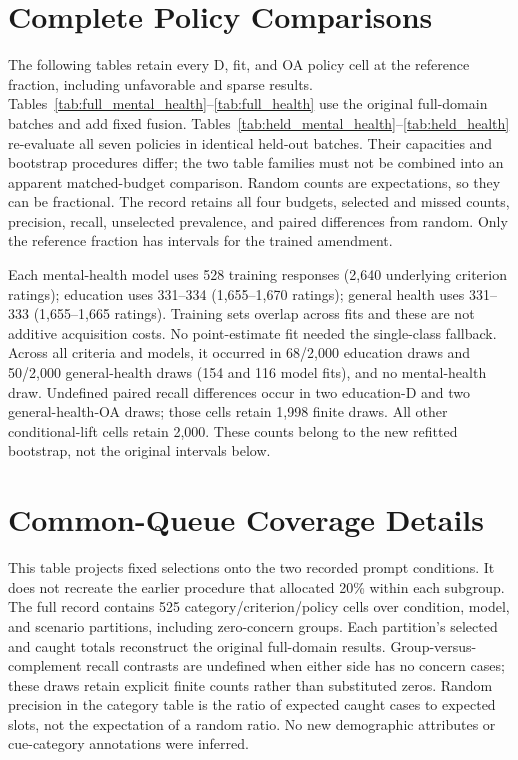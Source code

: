 \documentclass[manuscript,screen,review,anonymous]{acmart}
\begin{document}
\section{Complete Policy Comparisons}\label{app:complete}
The following tables retain every D, fit, and OA policy cell at the reference fraction, including unfavorable and sparse results. Tables~\ref{tab:full_mental_health}--\ref{tab:full_health} use the original full-domain batches and add fixed fusion. Tables~\ref{tab:held_mental_health}--\ref{tab:held_health} re-evaluate all seven policies in identical held-out batches. Their capacities and bootstrap procedures differ; the two table families must not be combined into an apparent matched-budget comparison. Random counts are expectations, so they can be fractional. The record retains all four budgets, selected and missed counts, precision, recall, unselected prevalence, and paired differences from random. Only the reference fraction has intervals for the trained amendment.








Each mental-health model uses 528 training responses (2,640 underlying criterion ratings); education uses 331--334 (1,655--1,670 ratings); general health uses 331--333 (1,655--1,665 ratings). Training sets overlap across fits and these are not additive acquisition costs. No point-estimate fit needed the single-class fallback. Across all criteria and models, it occurred in 68/2,000 education draws and 50/2,000 general-health draws (154 and 116 model fits), and no mental-health draw. Undefined paired recall differences occur in two education-D and two general-health-OA draws; those cells retain 1,998 finite draws. All other conditional-lift cells retain 2,000. These counts belong to the new refitted bootstrap, not the original intervals below.

\section{Common-Queue Coverage Details}\label{app:queue}

This table projects fixed selections onto the two recorded prompt conditions. It does not recreate the earlier procedure that allocated 20\% within each subgroup. The full record contains 525 category/criterion/policy cells over condition, model, and scenario partitions, including zero-concern groups. Each partition's selected and caught totals reconstruct the original full-domain results. Group-versus-complement recall contrasts are undefined when either side has no concern cases; these draws retain explicit finite counts rather than substituted zeros. Random precision in the category table is the ratio of expected caught cases to expected slots, not the expectation of a random ratio. No new demographic attributes or cue-category annotations were inferred.
\end{document}
